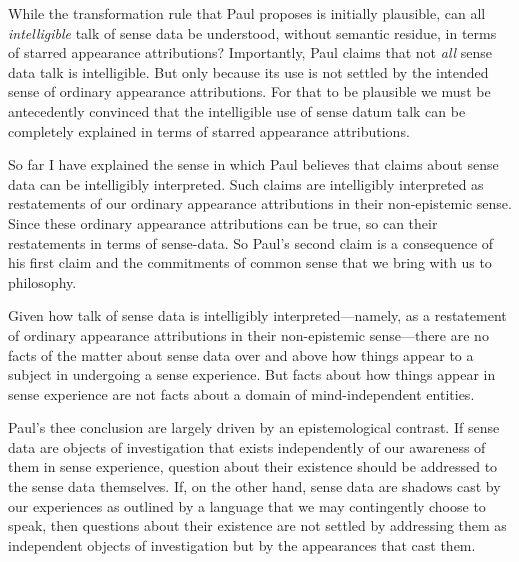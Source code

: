 \documentclass[11pt]{article}
\begin{document}
\begin{discussion}
    While the transformation rule that Paul proposes is initially plausible, can all \emph{intelligible} talk of sense data be understood, without semantic residue, in terms of starred appearance attributions? Importantly, Paul claims that not \emph{all} sense data talk is intelligible. But only because its use is not settled by the intended sense of ordinary appearance attributions. For that to be plausible we must be antecedently convinced that the intelligible use of sense datum talk can be completely explained in terms of starred appearance attributions.
\end{discussion}

So far I have explained the sense in which Paul believes that claims about sense data can be intelligibly interpreted. Such claims are intelligibly interpreted as restatements of our ordinary appearance attributions in their non-epistemic sense. Since these ordinary appearance attributions can be true, so can their restatements in terms of sense-data. So Paul's second claim is a consequence of his first claim and the commitments of common sense that we bring with us to philosophy.

Given how talk of sense data is intelligibly interpreted---namely, as a restatement of ordinary appearance attributions in their non-epistemic sense\----there are no facts of the matter about sense data over and above how things appear to a subject in undergoing a sense experience. But facts about how things appear in sense experience are not facts about a domain of mind-independent entities. 


Paul's thee conclusion are largely driven by an epistemological contrast. If sense data are objects of investigation that exists independently of our awareness of them in sense experience, question about their existence should be addressed to the sense data themselves. If, on the other hand, sense data are shadows cast by our experiences as outlined by a language that we may contingently choose to speak, then questions about their existence are not settled by addressing them as independent objects of investigation but by the appearances that cast them.
\end{document}
